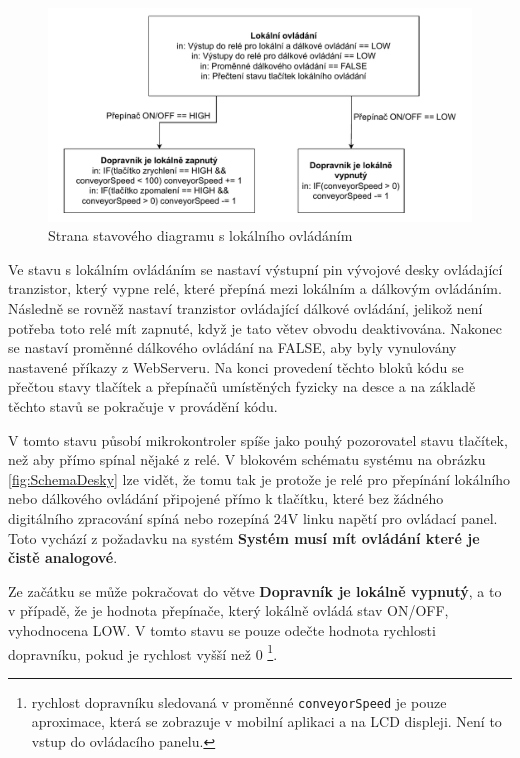 \begin{figure}[H]
	\centering
	\includegraphics[width=1\linewidth]{images/StateFlow_Firmwaru_left.drawio.pdf}
	\caption{Strana stavového diagramu s lokálního ovládáním}
	\label{fig:StateFlow_Firmwaru_left}
\end{figure}

Ve stavu s lokálním ovládáním se nastaví výstupní pin vývojové desky ovládající tranzistor, který vypne relé, které přepíná mezi lokálním a dálkovým ovládáním. Následně se rovněž nastaví tranzistor ovládající dálkové ovládání, jelikož není potřeba toto relé mít zapnuté, když je tato větev obvodu deaktivována. Nakonec se nastaví proměnné dálkového ovládání na FALSE, aby byly vynulovány nastavené příkazy z WebServeru. Na konci provedení těchto bloků kódu se přečtou stavy tlačítek a přepínačů umístěných fyzicky na desce a na základě těchto stavů se pokračuje v provádění kódu.

V tomto stavu působí mikrokontroler spíše jako pouhý pozorovatel stavu tlačítek, než aby přímo spínal nějaké z relé. V blokovém schématu systému na obrázku \ref{fig:SchemaDesky} lze vidět, že tomu tak je protože je relé pro přepínání lokálního nebo dálkového ovládání připojené přímo k tlačítku, které bez žádného digitálního zpracování spíná nebo rozepíná 24V linku napětí pro ovládací panel. Toto vychází z požadavku na systém \textbf{Systém musí mít ovládání které je čistě analogové}.

Ze začátku se může pokračovat do větve \textbf{Dopravník je lokálně vypnutý}, a to v případě, že je hodnota přepínače, který lokálně ovládá stav ON/OFF, vyhodnocena LOW. V tomto stavu se pouze odečte hodnota rychlosti dopravníku, pokud je rychlost vyšší než 0 \footnote{rychlost dopravníku sledovaná v proměnné \texttt{conveyorSpeed} je pouze aproximace, která se zobrazuje v mobilní aplikaci a na LCD displeji. Není to vstup do ovládacího panelu.}.

